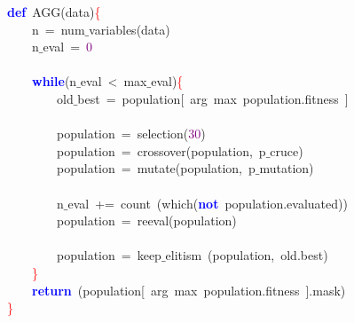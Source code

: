 \noindent
\mbox{}\textbf{\textcolor{Blue}{def}}\ AGG\textcolor{BrickRed}{(}data\textcolor{BrickRed}{)}\textcolor{Red}{\{} \\
\mbox{}\ \ \ \ n\ \textcolor{BrickRed}{=}\ num$\_$variables\textcolor{BrickRed}{(}data\textcolor{BrickRed}{)} \\
\mbox{}\ \ \ \ n$\_$eval\ \textcolor{BrickRed}{=}\ \textcolor{Purple}{0} \\
\mbox{} \\
\mbox{}\ \ \ \ \textbf{\textcolor{Blue}{while}}\textcolor{BrickRed}{(}n$\_$eval\ \textcolor{BrickRed}{\textless{}}\ max$\_$eval\textcolor{BrickRed}{)}\textcolor{Red}{\{} \\
\mbox{}\ \ \ \ \ \ \ \ old$\_$best\ \textcolor{BrickRed}{=}\ population\textcolor{BrickRed}{[}\ arg\ max\ population\textcolor{BrickRed}{.}fitness\ \textcolor{BrickRed}{]} \\
\mbox{} \\
\mbox{}\ \ \ \ \ \ \ \ population\ \textcolor{BrickRed}{=}\ selection\textcolor{BrickRed}{(}\textcolor{Purple}{30}\textcolor{BrickRed}{)} \\
\mbox{}\ \ \ \ \ \ \ \ population\ \textcolor{BrickRed}{=}\ crossover\textcolor{BrickRed}{(}population\textcolor{BrickRed}{,}\ p$\_$cruce\textcolor{BrickRed}{)} \\
\mbox{}\ \ \ \ \ \ \ \ population\ \textcolor{BrickRed}{=}\ mutate\textcolor{BrickRed}{(}population\textcolor{BrickRed}{,}\ p$\_$mutation\textcolor{BrickRed}{)} \\
\mbox{} \\
\mbox{}\ \ \ \ \ \ \ \ n$\_$eval\ \textcolor{BrickRed}{+=}\ count\ \textcolor{BrickRed}{(}which\textcolor{BrickRed}{(}\textbf{\textcolor{Blue}{not}}\ population\textcolor{BrickRed}{.}evaluated\textcolor{BrickRed}{))} \\
\mbox{}\ \ \ \ \ \ \ \ population\ \textcolor{BrickRed}{=}\ reeval\textcolor{BrickRed}{(}population\textcolor{BrickRed}{)} \\
\mbox{} \\
\mbox{}\ \ \ \ \ \ \ \ population\ \textcolor{BrickRed}{=}\ keep$\_$elitism\ \textcolor{BrickRed}{(}population\textcolor{BrickRed}{,}\ old\textcolor{BrickRed}{.}best\textcolor{BrickRed}{)} \\
\mbox{}\ \ \ \ \textcolor{Red}{\}} \\
\mbox{}\ \ \ \ \textbf{\textcolor{Blue}{return}}\ \textcolor{BrickRed}{(}population\textcolor{BrickRed}{[}\ arg\ max\ population\textcolor{BrickRed}{.}fitness\ \textcolor{BrickRed}{].}mask\textcolor{BrickRed}{)} \\
\mbox{}\textcolor{Red}{\}} \\
\mbox{}
